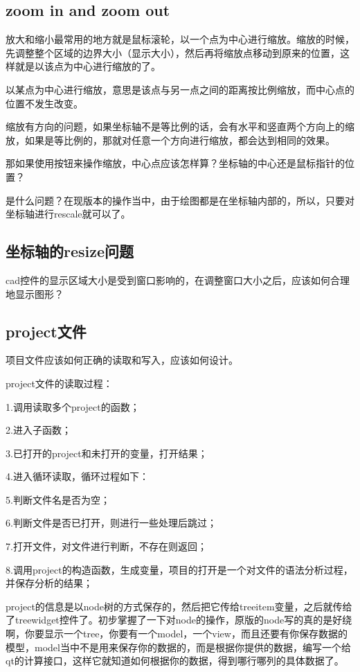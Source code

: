 \subsection{zoom in and zoom out}
放大和缩小最常用的地方就是鼠标滚轮，以一个点为中心进行缩放。缩放的时候，先调整整个区域的边界大小（显示大小），然后再将缩放点移动到原来的位置，这样就是以该点为中心进行缩放的了。

以某点为中心进行缩放，意思是该点与另一点之间的距离按比例缩放，而中心点的位置不发生改变。

缩放有方向的问题，如果坐标轴不是等比例的话，会有水平和竖直两个方向上的缩放，如果是等比例的，那就对任意一个方向进行缩放，都会达到相同的效果。

那如果使用按钮来操作缩放，中心点应该怎样算？坐标轴的中心还是鼠标指针的位置？

是什么问题？在现版本的操作当中，由于绘图都是在坐标轴内部的，所以，只要对坐标轴进行rescale就可以了。
\subsection{坐标轴的resize问题}
cad控件的显示区域大小是受到窗口影响的，在调整窗口大小之后，应该如何合理地显示图形？
\subsection{project文件}
项目文件应该如何正确的读取和写入，应该如何设计。

project文件的读取过程：

1.调用读取多个project的函数；

2.进入子函数；

3.已打开的project和未打开的变量，打开结果；

4.进入循环读取，循环过程如下：

5.判断文件名是否为空；

6.判断文件是否已打开，则进行一些处理后跳过；

7.打开文件，对文件进行判断，不存在则返回；

8.调用project的构造函数，生成变量，项目的打开是一个对文件的语法分析过程，并保存分析的结果；

project的信息是以node树的方式保存的，然后把它传给treeitem变量，之后就传给了treewidget控件了。初步掌握了一下对node的操作，原版的node写的真的是好绕啊，你要显示一个tree，你要有一个model，一个view，而且还要有你保存数据的模型，model当中不是用来保存你的数据的，而是根据你提供的数据，编写一个给qt的计算接口，这样它就知道如何根据你的数据，得到哪行哪列的具体数据了。

